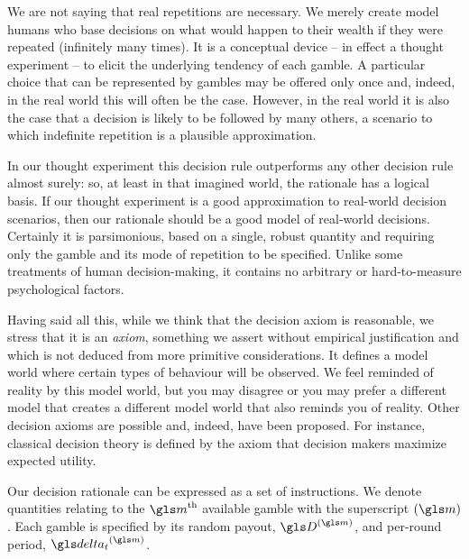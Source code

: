 We are not saying that real repetitions are necessary. We 
merely create model humans who base decisions on what would 
happen to their wealth if they were repeated (infinitely many times). It is a 
conceptual device -- in effect a thought experiment -- to elicit the 
underlying tendency of each gamble. A particular choice that can be 
represented by gambles 
may be offered only once and, indeed, in the real world this will 
often be the case. However, in the real world it is also the case 
that a decision is likely to be followed by many others, a scenario 
to which indefinite repetition is a plausible approximation.

In our thought experiment this decision rule outperforms any other 
decision rule almost surely: so, at least in that imagined world, the 
rationale has a logical basis. If our thought experiment is a good 
approximation to real-world decision scenarios, then our rationale 
should be a good model of real-world decisions. Certainly it is 
parsimonious, based on a single, 
robust quantity and requiring only the gamble and its mode of repetition 
to be specified. Unlike some treatments of human decision-making, it 
contains no arbitrary or hard-to-measure psychological factors.

Having said all this, while we think that the decision axiom 
is reasonable, we stress that it is an \textit{axiom}, \ie something we assert without empirical justification and which is not deduced from more primitive considerations. It 
defines a model world where certain types of behaviour will be observed. 
We feel reminded of reality by this model world, but you may disagree 
or you may prefer a different model that creates a different model world
that also reminds you of reality.
Other decision axioms are 
possible and, indeed, have been proposed. For instance, 
classical decision theory is defined by the axiom that decision
makers maximize expected utility. 


Our decision rationale can be expressed as a set of instructions.
We denote quantities relating to the $\m^\text{th}$ available gamble with the 
superscript $(\m)$. Each gamble is specified by its random payout, $\gD^{(\m)}$, and 
per-round period, $\dt^{(\m)}$. 

